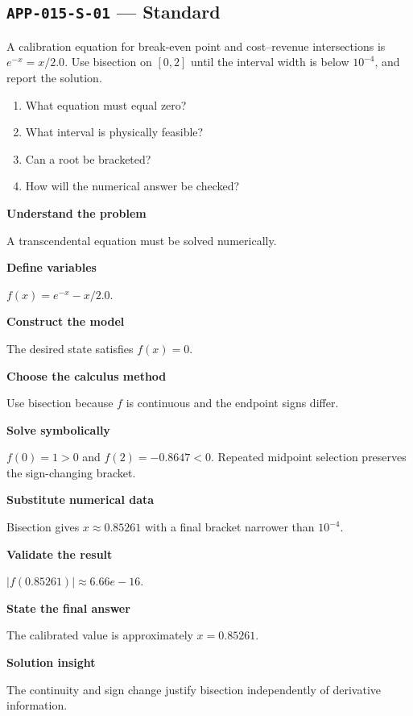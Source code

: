 \documentclass[11pt]{book}
\newcommand{\pid}[1]{\texttt{#1}}
\begin{document}
\subsection*{\pid{APP-015-S-01} — Standard}
\begin{problembox}
A calibration equation for break-even point and cost–revenue intersections is $e^{-x}=x/2.0$. Use bisection on $[0,2]$ until the interval width is below $10^{-4}$, and report the solution.
\end{problembox}
\begin{promptbox}\begin{enumerate}
\item What equation must equal zero?
\item What interval is physically feasible?
\item Can a root be bracketed?
\item How will the numerical answer be checked?
\end{enumerate}\end{promptbox}
\begin{solutionbox}
\textbf{Understand the problem}\par A transcendental equation must be solved numerically.\par\medskip
\textbf{Define variables}\par $f(x)=e^{-x}-x/2.0$.\par\medskip
\textbf{Construct the model}\par The desired state satisfies $f(x)=0$.\par\medskip
\textbf{Choose the calculus method}\par Use bisection because $f$ is continuous and the endpoint signs differ.\par\medskip
\textbf{Solve symbolically}\par $f(0)=1>0$ and $f(2)=-0.8647<0$. Repeated midpoint selection preserves the sign-changing bracket.\par\medskip
\textbf{Substitute numerical data}\par Bisection gives $x\approx 0.85261$ with a final bracket narrower than $10^{-4}$.\par\medskip
\textbf{Validate the result}\par $|f(0.85261)|\approx 6.66e-16$.\par\medskip
\textbf{State the final answer}\par The calibrated value is approximately $x=0.85261$.\par\medskip
\textbf{Solution insight}\par The continuity and sign change justify bisection independently of derivative information.\par\medskip
\end{solutionbox}
\end{document}

